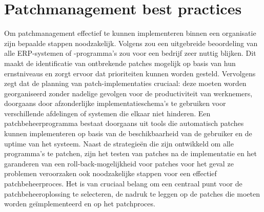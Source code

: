 \section{Patchmanagement best practices}
Om patchmanagement effectief te kunnen implementeren binnen een organisatie zijn bepaalde stappen noodzakelijk. Volgens \textcite{Robb2023} zou een uitgebreide beoordeling van alle 
ERP-systemen of -programma's zou voor een bedrijf zeer nuttig blijken. Dit maakt de identificatie van ontbrekende patches mogelijk op basis van hun 
ernstniveaus en zorgt ervoor dat prioriteiten kunnen worden gesteld. Vervolgens zegt \textcite{ManageEngine2024} dat de planning van patch-implementaties cruciaal: deze moeten worden 
georganiseerd zonder nadelige gevolgen voor de productiviteit van werknemers, doorgaans door afzonderlijke implementatieschema's te gebruiken voor verschillende 
afdelingen of systemen die elkaar niet hinderen. Een patchbeheerprogramma bestaat doorgaans uit tools die automatisch patches kunnen implementeren op basis 
van de beschikbaarheid van de gebruiker en de uptime van het systeem. Naast de strategieën die zijn ontwikkeld om alle programma's te patchen, zijn het 
testen van patches na de implementatie en het garanderen van een roll-back-mogelijkheid voor patches voor het geval ze problemen veroorzaken ook noodzakelijke 
stappen voor een effectief patchbeheerproces. Het is van cruciaal belang om een ​​centraal punt voor de patchbeheeroplossing te selecteren, de nadruk te leggen 
op de patches die moeten worden geïmplementeerd en op het patchproces. \autocite{ManageEngine2024}


